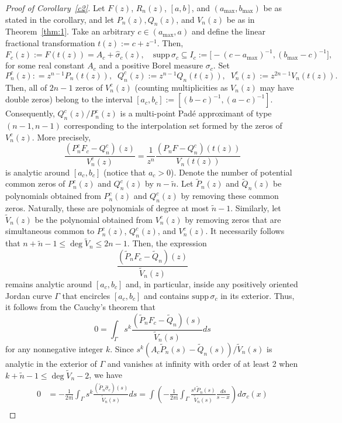 \documentclass[twoside,a4paper]{amsart}
\newcommand{\supp}{\mathrm{supp}}
\newcommand{\ic}{\mathrm{i}}
\theoremstyle{remark}
\begin{document}
\begin{proof}[Proof of Corollary~\ref{c2}]

Let $F(z)$, \( R_n(z) \), \( [a,b] \), and $(a_{\max},b_{\max})$ be as stated in the corollary, and let \( P_n(z),Q_n(z) \), and \( V_n(z) \) be as in Theorem~\ref{thm:1}. Take an arbitrary $c\in (a_{\max},a)$ and define the linear fractional transformation \( t(z) := c+z^{-1} \). Then,
\[
F_c(z) := F(t(z)) = A_c + \widehat\sigma_c(z), \quad \supp\, \sigma_c \subseteq I_c:=\big[-(c-a_{\max})^{-1},(b_{\max}-c)^{-1}\big],
\]
for some real constant \( A_c \) and a positive Borel measure $\sigma_c$. Set
\[
P_n^c(z) : = z^{n-1}P_n(t(z)), \;\; Q_n^c(z) := z^{n-1}Q_n(t(z)), \;\;  V_n^c(z) := z^{2n-1} V_n(t(z)).
\]
Then, all of \( 2n-1 \) zeros of \( V_n^c(z) \) (counting multiplicities as \( V_n(z)\) may have double zeros)  belong to the interval \( [a_c,b_c]:=[(b-c)^{-1},(a-c)^{-1}] \). Consequently, \( Q_n^c(z)/P_n^c(z) \) is a multi-point Pad\'e approximant of type \( (n-1,n-1) \) corresponding to the interpolation set formed by the zeros of \( V_n^c(z) \). More precisely,
\[
\frac{(P_n^c F_c-Q_n^c)(z)}{V_n^c(z)} = \frac1{z^n}\frac{(P_n F-Q_n^c)(t(z))}{V_n(t(z))}
\]
is analytic around \( [a_c,b_c] \) (notice that \( a_c>0 \)). Denote the number of potential common zeros of \( P_n^c(z) \) and \( Q_n^c(z) \) by \( n-\tilde n \). Let \( \tilde P_n(z) \) and \( \tilde Q_n(z) \) be polynomials obtained from \( P_n^c(z) \) and \( Q_n^c(z) \) by removing these common zeros. Naturally, these are polynomials of degree at most \( \tilde n-1 \). Similarly, let \( \tilde V_n(z) \) be the polynomial obtained from \( V_n^c(z) \) by removing zeros that are  simultaneous common to \( P_n^c(z) \), \( Q_n^c(z) \), and \( V_n^c(z) \). It necessarily follows that \( n+\tilde n-1\leq \deg \tilde V_n \leq 2n-1\). Then, the expression 
\[
\frac{(\tilde P_nF_c -\tilde Q_n)(z)}{\tilde V_n(z)}
\]
remains analytic around \( [a_c,b_c] \) and, in particular, inside any positively oriented Jordan curve \( \Gamma \) that encircles \( [a_c,b_c] \) and contains \(\supp\, \sigma_c \) in its exterior. Thus, it follows from the Cauchy's theorem that
\[
0 = \int_{\Gamma} s^k\frac{(\tilde P_nF_c -\tilde Q_n)(s)}{\tilde V_n(s)} ds
\]
for any nonnegative integer \( k \). Since \( s^k (A_c\tilde P_n(s)-\tilde Q_n(s))/\tilde V_n(s) \) is analytic in the exterior of \( \Gamma \) and vanishes at infinity with order of at least 2 when \( k+\tilde n-1\leq \deg \tilde V_n-2\), we have
\begin{align}
0 & = -\frac1{2\pi\ic}\int_{\Gamma} s^k\frac{(\tilde P_n\widehat \sigma_c)(s)}{\tilde V_n(s)} ds = \int \left( -\frac1{2\pi\ic}\int_{\Gamma} \frac{s^k \tilde P_n(s)}{\tilde V_n(s)}\frac{ds}{s-x}\right) d\sigma_{c}(x) \\

\end{align}
\end{proof}
\end{document}
